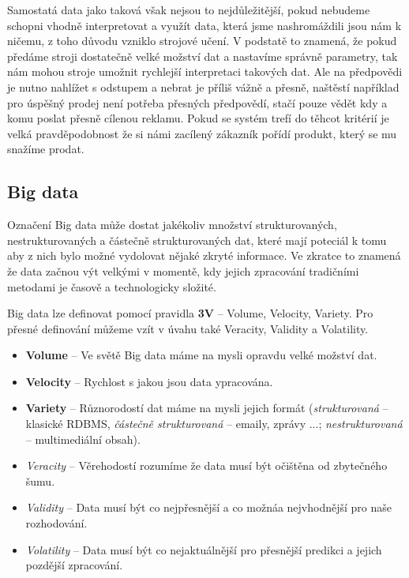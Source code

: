 \par Samostatá data jako taková však nejsou to nejdůležitější, pokud nebudeme schopni vhodně interpretovat a využít data, která jsme nashromáždili jsou nám k ničemu, z toho důvodu vzniklo strojové učení. V podstatě to znamená, že pokud předáme stroji dostatečně velké možství dat a nastavíme správně parametry, tak nám mohou stroje umožnit rychlejší interpretaci takových dat. Ale na předpovědi je nutno nahlížet s odstupem a nebrat je příliš vážně a přesně, naštěstí například pro úspěšný prodej není potřeba přesných předpovědí, stačí pouze vědět kdy a komu poslat přesně cílenou reklamu. Pokud se systém trefí do těhcot kritérií je velká pravděpodobnost že si námi zacílený zákazník pořídí produkt, který se mu snažíme prodat. \cite{predictive-analytics}

\subsection{Big data} \label{big-data}
Označení Big data může dostat jakékoliv množství strukturovaných, nestrukturovaných a částečně strukturovaných dat, které mají poteciál k tomu aby z nich bylo možné vydolovat nějaké zkryté informace. Ve zkratce to znamená že data začnou výt velkými v momentě, kdy jejich zpracování tradičními metodami je časově a technologicky složité.\cite{big-data-anayitics}

\par Big data lze definovat pomocí pravidla \textbf{3V} -- Volume, Velocity, Variety. Pro přesné definování můžeme vzít v úvahu také Veracity, Validity a Volatility.\cite{big-data-anayitics}
\begin{itemize}
  \item \textbf{Volume} -- Ve světě Big data máme na mysli opravdu velké možství dat.
  \item \textbf{Velocity} -- Rychlost s jakou jsou data ypracována.
  \item \textbf{Variety} -- Různorodostí dat máme na mysli jejich formát (\textit{strukturovaná} -- klasické RDBMS, \textit{částečně strukturovaná} -- emaily, zprávy ...; \textit{nestrukturovaná} -- multimediální obsah).
  \item \textit{Veracity} -- Věrehodostí rozumíme že data musí být očištěna od zbytečného šumu.
  \item \textit{Validity} -- Data musí být co nejpřesnější a co možnáa nejvhodnější pro naše rozhodování.
  \item \textit{Volatility} -- Data musí být co nejaktuálnější pro přesnější predikci a jejich pozdější zpracování. \cite{big-data-anayitics}
\end{itemize}

